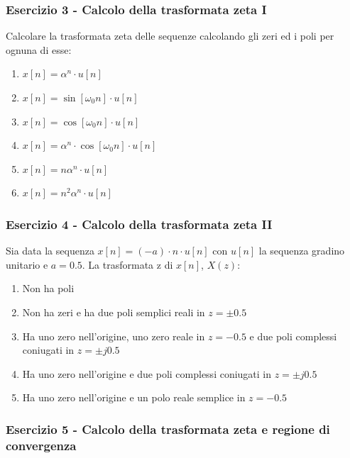 \documentclass[../main.tex]{subfiles}
\begin{document}
\subsubsection{Esercizio 3 - Calcolo della trasformata zeta I}

Calcolare la trasformata zeta delle sequenze calcolando gli zeri ed i poli per ognuna di esse:

\begin{enumerate}
	\item[\textbf{1)}] $x[n] = \alpha^n \cdot u[n]$
	\item[\textbf{2)}] $x[n] = \sin[\omega_0n] \cdot u[n]$
	\item[\textbf{3)}] $x[n] = \cos[\omega_0n] \cdot u[n]$
	\item[\textbf{4)}] $x[n] = \alpha^n \cdot \cos[\omega_0n] \cdot u[n]$
	\item[\textbf{5)}] $x[n] = n\alpha^n \cdot u[n]$
	\item[\textbf{6)}] $x[n] = n^2\alpha^n \cdot u[n]$
\end{enumerate}


\subsubsection{Esercizio 4 - Calcolo della trasformata zeta II}

Sia data la sequenza $x[n] = (- a)\cdot n \cdot u[n]$ con $u[n]$ la sequenza gradino unitario
e $ a = 0.5$. La trasformata z di $x[n]$, $X(z)$:

\begin{enumerate}
	\item[\textbf{a)}] Non ha poli
	\item[\textbf{b)}] Non ha zeri e ha due poli semplici reali in $z = \pm 0.5$
	\item[\textbf{c)}] Ha uno zero nell’origine, uno zero reale in $z = -0.5$ e due poli complessi coniugati in $z = \pm j0.5$
	\item[\textbf{d)}] Ha uno zero nell’origine e due poli complessi coniugati in $z = \pm j0.5$
	\item[\textbf{e)}] Ha uno zero nell’origine e un polo reale semplice in $z=-0.5$
\end{enumerate}


\subsubsection{Esercizio 5 - Calcolo della trasformata zeta e regione di convergenza}
\end{document}
